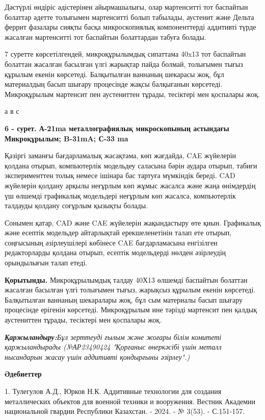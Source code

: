 Дәстүрлі өндіріс әдістерінен айырмашылығы, олар мартенситті тот
баспайтын болаттар әдетте толығымен мартенситті болып табылады, аустенит
және Дельта феррит фазалары сияқты басқа микроскопиялық компоненттерді
аддитивті түрде жасалған мартенситті тот баспайтын болаттардан табуға
болады.

7 суретте көрсетілгендей, микроқұрылымдық сипаттама 40x13 тот баспайтын
болаттан жасалған басылған үлгі жарықтар пайда болмай, толығымен тығыз
құрылым екенін көрсетеді. Балқытылған ваннаның шекарасы жоқ, бұл
материалдың басып шығару процесінде жақсы балқығанын көрсетеді.
Микроқұрылым мартенсит пен аустениттен тұрады, тесіктері мен қоспалары
жоқ.

а в с

{\bfseries 6 - сурет. А-21ma металлографиялық микроскопының астындағы
Микроқұрылым; B-31mA; С-33 ma}

Қазіргі заманғы бағдарламалық жасақтама, көп жағдайда, CAE жүйелерін
қолдана отырып, компьютерлік модельдеу саласына бәрін аудара отырып,
табиғи эксперименттен толық немесе ішінара бас тартуға мүмкіндік береді.
CAD жүйелерін қолдану арқылы неғұрлым көп жұмыс жасалса және жаңа
өнімдердің үш өлшемді графикалық модельдері неғұрлым көп жасалса,
компьютерлік талдауды қолдану соғұрлым қызықты болады.

Сонымен қатар, CAD және CAE жүйелерін жақындастыру өте қиын. Графикалық
және есептік модельдер айтарлықтай ерекшеленетінін талап ете отырып,
соңғысының әзірлеушілері көбінесе CAE бағдарламасына енгізілген
редакторларды қолдана отырып, есептік модельдерді нөлден әзірлеудің
орындылығын талап етеді.

{\bfseries Қорытынды.} Микроқұрылымдық талдау 40Х13 өлшемді баспайтын
болаттан жасалған басылған үлгі толығымен тығыз, жарықсыз құрылым екенін
көрсетеді. Балқытылған ваннаның шекаралары жоқ, бұл сым материалы басып
шығару процесінде ерігенін көрсетеді. Микроқұрылым ине тәрізді мартенсит
пен қалдық аустениттен тұрады, тесіктері мен қоспалары жоқ\emph{.}

\emph{{\bfseries Қаржыландыру:}Бұл зерттеуді ғылым және жоғары білім
комитеті қаржыландырады (№АР23490424 "Қорғаныс өнеркәсібі үшін металл
нысандарын жасау үшін аддитивті қондырғыны әзірлеу".)}

{\bfseries Әдебиеттер}

1. Тулегулов А.Д., Юрков Н.К. Аддитивные технологии для создания
металлических объектов для военной техники и вооружения. Вестник
Академии национальной гвардии Республики Казахстан. - 2024. - № 3(53). -
С.151-157.

